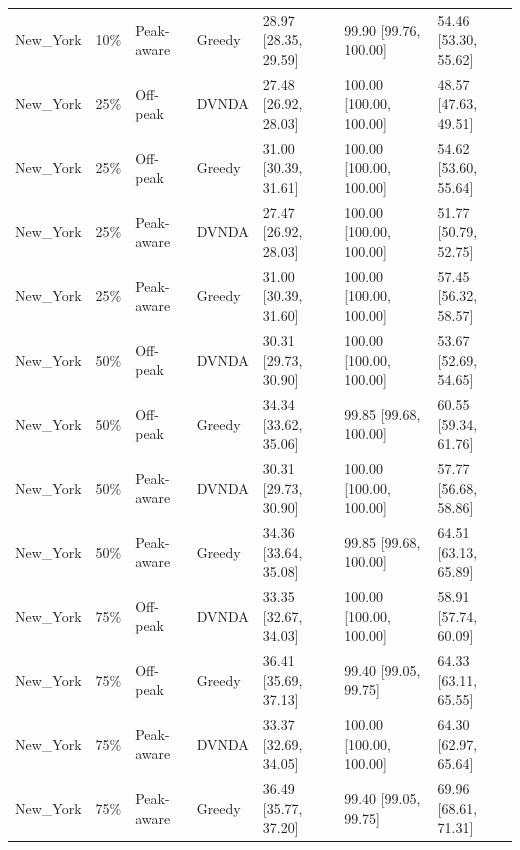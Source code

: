 \begin{tabular}{lllllll}
New\_York & 10\% & Peak-aware & Greedy & 28.97 [28.35, 29.59] & 99.90 [99.76, 100.00] & 54.46 [53.30, 55.62] \\
New\_York & 25\% & Off-peak & DVNDA & 27.48 [26.92, 28.03] & 100.00 [100.00, 100.00] & 48.57 [47.63, 49.51] \\
New\_York & 25\% & Off-peak & Greedy & 31.00 [30.39, 31.61] & 100.00 [100.00, 100.00] & 54.62 [53.60, 55.64] \\
New\_York & 25\% & Peak-aware & DVNDA & 27.47 [26.92, 28.03] & 100.00 [100.00, 100.00] & 51.77 [50.79, 52.75] \\
New\_York & 25\% & Peak-aware & Greedy & 31.00 [30.39, 31.60] & 100.00 [100.00, 100.00] & 57.45 [56.32, 58.57] \\
New\_York & 50\% & Off-peak & DVNDA & 30.31 [29.73, 30.90] & 100.00 [100.00, 100.00] & 53.67 [52.69, 54.65] \\
New\_York & 50\% & Off-peak & Greedy & 34.34 [33.62, 35.06] & 99.85 [99.68, 100.00] & 60.55 [59.34, 61.76] \\
New\_York & 50\% & Peak-aware & DVNDA & 30.31 [29.73, 30.90] & 100.00 [100.00, 100.00] & 57.77 [56.68, 58.86] \\
New\_York & 50\% & Peak-aware & Greedy & 34.36 [33.64, 35.08] & 99.85 [99.68, 100.00] & 64.51 [63.13, 65.89] \\
New\_York & 75\% & Off-peak & DVNDA & 33.35 [32.67, 34.03] & 100.00 [100.00, 100.00] & 58.91 [57.74, 60.09] \\
New\_York & 75\% & Off-peak & Greedy & 36.41 [35.69, 37.13] & 99.40 [99.05, 99.75] & 64.33 [63.11, 65.55] \\
New\_York & 75\% & Peak-aware & DVNDA & 33.37 [32.69, 34.05] & 100.00 [100.00, 100.00] & 64.30 [62.97, 65.64] \\
New\_York & 75\% & Peak-aware & Greedy & 36.49 [35.77, 37.20] & 99.40 [99.05, 99.75] & 69.96 [68.61, 71.31] \\
\hline
\end{tabular}
